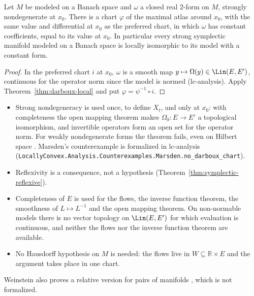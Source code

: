 \begin{theorem}
  \label{thm:darboux}
  \leanok
  Let $M$ be modeled on a Banach space and $\omega$ a closed real $2$-form on $M$, strongly
  nondegenerate at $x_0$. There is a chart $\varphi$ of the maximal atlas around $x_0$, with the
  same value and differential at $x_0$ as the preferred chart, in which $\omega$ has constant
  coefficients, equal to its value at $x_0$. In particular every strong symplectic manifold modeled
  on a Banach space is locally isomorphic to its model with a constant form.
\end{theorem}

\begin{proof}
  \leanok
  In the preferred chart $i$ at $x_0$, $\omega$ is a smooth map $y \mapsto \Omega(y) \in
  \Lin(E, E')$, continuous for the operator norm since the model is normed (lc-analysis). Apply
  Theorem~\ref{thm:darboux-local} and put $\varphi = \psi^{-1} \circ i$.
\end{proof}

\begin{remark}
  \label{rem:darboux-subtleties}
  \begin{itemize}
    \item Strong nondegeneracy is used once, to define $X_t$, and only at $x_0$: with completeness
      the open mapping theorem makes $\Omega_0 \colon E \to E'$ a topological isomorphism, and
      invertible operators form an open set for the operator norm. For weakly nondegenerate forms
      the theorem fails, even on Hilbert space \cite[Proposition, p.~591]{Mar72}. Marsden's
      counterexample is formalized in lc-analysis
      (\texttt{LocallyConvex.Analysis.Counterexamples.Marsden.no\_darboux\_chart}).
    \item Reflexivity is a consequence, not a hypothesis (Theorem~\ref{thm:symplectic-reflexive}).
    \item Completeness of $E$ is used for the flows, the inverse function theorem, the smoothness
      of $L \mapsto L^{-1}$ and the open mapping theorem. On non-normable models there is no
      vector topology on $\Lin(E, E')$ for which evaluation is continuous, and neither the flows
      nor the inverse function theorem are available.
    \item No Hausdorff hypothesis on $M$ is needed: the flows live in $W \subseteq \mathbb{R} \times
      E$ and the argument takes place in one chart.
  \end{itemize}
  Weinstein also proves a relative version for pairs of manifolds \cite[Theorem~4.1,
  Corollary~4.2]{Wei71}, which is not formalized.
\end{remark}
